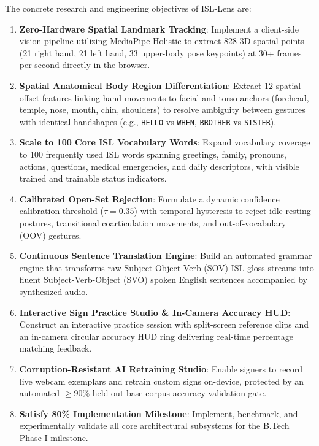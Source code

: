 The concrete research and engineering objectives of ISL-Lens are:
\begin{enumerate}
    \setlength{\itemsep}{0pt}
    \setlength{\parskip}{0pt}
    \item \textbf{Zero-Hardware Spatial Landmark Tracking}: Implement a client-side vision pipeline utilizing MediaPipe Holistic to extract 828 3D spatial points (21 right hand, 21 left hand, 33 upper-body pose keypoints) at 30+ frames per second directly in the browser.
    \item \textbf{Spatial Anatomical Body Region Differentiation}: Extract 12 spatial offset features linking hand movements to facial and torso anchors (forehead, temple, nose, mouth, chin, shoulders) to resolve ambiguity between gestures with identical handshapes (e.g., \texttt{HELLO} vs \texttt{WHEN}, \texttt{BROTHER} vs \texttt{SISTER}).
    \item \textbf{Scale to 100 Core ISL Vocabulary Words}: Expand vocabulary coverage to 100 frequently used ISL words spanning greetings, family, pronouns, actions, questions, medical emergencies, and daily descriptors, with visible trained and trainable status indicators.
    \item \textbf{Calibrated Open-Set Rejection}: Formulate a dynamic confidence calibration threshold ($\tau = 0.35$) with temporal hysteresis to reject idle resting postures, transitional coarticulation movements, and out-of-vocabulary (OOV) gestures.
    \item \textbf{Continuous Sentence Translation Engine}: Build an automated grammar engine that transforms raw Subject-Object-Verb (SOV) ISL gloss streams into fluent Subject-Verb-Object (SVO) spoken English sentences accompanied by synthesized audio.
    \item \textbf{Interactive Sign Practice Studio \& In-Camera Accuracy HUD}: Construct an interactive practice session with split-screen reference clips and an in-camera circular accuracy HUD ring delivering real-time percentage matching feedback.
    \item \textbf{Corruption-Resistant AI Retraining Studio}: Enable signers to record live webcam exemplars and retrain custom signs on-device, protected by an automated $\ge 90\%$ held-out base corpus accuracy validation gate.
    \item \textbf{Satisfy 80\% Implementation Milestone}: Implement, benchmark, and experimentally validate all core architectural subsystems for the B.Tech Phase I milestone.
\end{enumerate}

